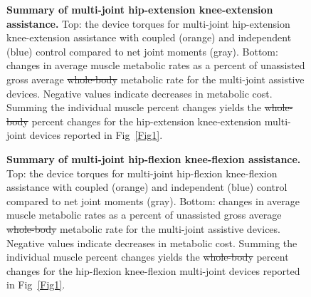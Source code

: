 \documentclass[10pt,letterpaper]{article}
\providecommand{\DIFaddtex}[1]{{\protect\color{blue}{#1}}} %
\providecommand{\DIFdeltex}[1]{{\protect\color{red}\sout{#1}}}                      %
\providecommand{\DIFaddFL}[1]{\DIFadd{#1}} %
\providecommand{\DIFdelFL}[1]{\DIFdel{#1}} %
\providecommand{\DIFaddbeginFL}{} %
\providecommand{\DIFaddendFL}{} %
\providecommand{\DIFdelbeginFL}{} %
\providecommand{\DIFdelendFL}{} %
\providecommand{\DIFadd}[1]{\texorpdfstring{\DIFaddtex{#1}}{#1}} %
\providecommand{\DIFdel}[1]{\texorpdfstring{\DIFdeltex{#1}}{}} %
\newcommand{\DIFscaledelfig}{0.5}
\newlength{\DIFdelgraphicswidth} %
\newlength{\DIFdelgraphicsheight} %
\newcommand{\DIFaddincludegraphics}[2][]{{\color{blue}\fbox{\DIFOincludegraphics[#1]{#2}}}} %
\newcommand{\DIFdelincludegraphics}[2][]{%
\sbox{\DIFdelgraphicsbox}{\DIFOincludegraphics[#1]{#2}}%
\settoboxwidth{\DIFdelgraphicswidth}{\DIFdelgraphicsbox} %
\settoboxtotalheight{\DIFdelgraphicsheight}{\DIFdelgraphicsbox} %
\scalebox{\DIFscaledelfig}{%
\parbox[b]{\DIFdelgraphicswidth}{\usebox{\DIFdelgraphicsbox}\\[-\baselineskip] \rule{\DIFdelgraphicswidth}{0em}}\llap{\resizebox{\DIFdelgraphicswidth}{\DIFdelgraphicsheight}{%
\setlength{\unitlength}{\DIFdelgraphicswidth}%
\begin{picture}(1,1)%
\thicklines\linethickness{2pt} %
{\color[rgb]{1,0,0}\put(0,0){\framebox(1,1){}}}%
{\color[rgb]{1,0,0}\put(0,0){\line( 1,1){1}}}%
{\color[rgb]{1,0,0}\put(0,1){\line(1,-1){1}}}%
\end{picture}%
}*{3pt}}} %
} %
\DeclareRobustCommand{\DIFaddbeginFL}{\DIFOaddbeginFL \let\includegraphics\DIFaddincludegraphics} %
\DeclareRobustCommand{\DIFaddendFL}{\DIFOaddendFL \let\includegraphics\DIFOincludegraphics} %
\DeclareRobustCommand{\DIFdelbeginFL}{\DIFOdelbeginFL \let\includegraphics\DIFdelincludegraphics} %
\DeclareRobustCommand{\DIFdelendFL}{\DIFOaddendFL \let\includegraphics\DIFOincludegraphics} %
\begin{document}
\begin{figure}[!h]
\begin{adjustwidth}{-1in}{0in} %
    \centering
    \caption{{\bf Summary of multi-joint hip-extension knee-extension assistance.}
        Top: the device torques for multi-joint hip-extension knee-extension assistance with coupled (orange) and independent (blue) control compared to net joint moments (gray). Bottom: changes in average muscle metabolic rates as a percent of unassisted gross average \DIFdelbeginFL \DIFdelFL{whole-body }\DIFdelendFL \DIFaddbeginFL \DIFaddFL{total }\DIFaddendFL metabolic rate for the multi-joint assistive devices. Negative values indicate decreases in metabolic cost. \DIFaddbeginFL \DIFaddFL{Solid bars and error bars indicate the mean and standard deviation across subjects, respectively. }\DIFaddendFL Summing the individual muscle percent changes yields the \DIFdelbeginFL \DIFdelFL{whole-body }\DIFdelendFL \DIFaddbeginFL \DIFaddFL{total }\DIFaddendFL percent changes for the hip-extension knee-extension multi-joint devices reported in Fig~\ref{Fig1}.}
\label{Fig2}
\end{adjustwidth}
\end{figure} 

\begin{figure}[!h]
\begin{adjustwidth}{-1in}{0in} %
    \centering
    \caption{{\bf Summary of multi-joint hip-flexion knee-flexion assistance.}
        Top: the device torques for multi-joint hip-flexion knee-flexion assistance with coupled (orange) and independent (blue) control compared to net joint moments (gray). Bottom: changes in average muscle metabolic rates as a percent of unassisted gross average \DIFdelbeginFL \DIFdelFL{whole-body }\DIFdelendFL \DIFaddbeginFL \DIFaddFL{total }\DIFaddendFL metabolic rate for the multi-joint assistive devices. Negative values indicate decreases in metabolic cost. \DIFaddbeginFL \DIFaddFL{Solid bars and error bars indicate the mean and standard deviation across subjects, respectively. }\DIFaddendFL Summing the individual muscle percent changes yields the \DIFdelbeginFL \DIFdelFL{whole-body }\DIFdelendFL \DIFaddbeginFL \DIFaddFL{total }\DIFaddendFL percent changes for the hip-flexion knee-flexion multi-joint devices reported in Fig~\ref{Fig1}.}
\label{Fig3}
\end{adjustwidth}
\end{figure}
\end{document}
